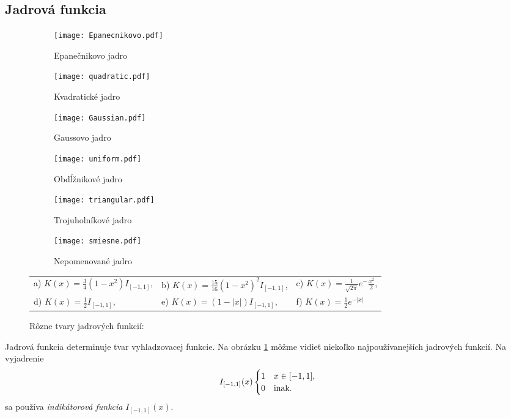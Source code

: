 \subsection{Jadrová funkcia}
\begin{figure}[!ht]
\centering
\begin{subfigure}{.3\textwidth}
  \centering
  \texttt{[image: Epanecnikovo.pdf]}
  \caption{Epanečnikovo jadro}
\end{subfigure}%
\begin{subfigure}{.3\textwidth}
  \centering
  \texttt{[image: quadratic.pdf]}
  \caption{Kvadratické jadro}
\end{subfigure}
\begin{subfigure}{.3\textwidth}
  \centering
  \texttt{[image: Gaussian.pdf]}
  \caption{Gaussovo jadro}
\end{subfigure}
\begin{subfigure}{.3\textwidth}
  \centering
  \texttt{[image: uniform.pdf]}
  \caption{Obdĺžnikové jadro}
\end{subfigure}
\begin{subfigure}{.3\textwidth}
  \centering
  \texttt{[image: triangular.pdf]}
  \caption{Trojuholníkové jadro}
\end{subfigure}
\begin{subfigure}{.3\textwidth}
  \centering
  \texttt{[image: smiesne.pdf]}
  \caption{Nepomenované jadro}
\end{subfigure}
\centering
\caption{Rôzne tvary jadrových funkcií:}\label{kernelShapeTypes}
\begin{tabular}{ l l l }
 a) $K(x)=\frac{3}{4}(1-x^2)I_{[-1,1]}$, & b) $K(x)=\frac{15}{16}(1-x^2)^2I_{[-1,1]}$, & c) $K(x)=\frac{1}{\sqrt{2\pi}}e^-\frac{x^2}{2} $, \\
 d) $K(x)=\frac{1}{2}I_{[-1,1]} $, & e) $K(x)=(1-|x|)I_{[-1,1]}$, & f) $K(x)=\frac{1}{2}e^{-|x|}$
 \end{tabular}
 
\end{figure}

Jadrová funkcia determinuje tvar vyhladzovacej funkcie. Na obrázku \ref{kernelShapeTypes} môžme vidieť niekoľko najpoužívanejších jadrových funkcií. Na vyjadrenie 
\begin{equation}
I_{[-1,1]}(x) \begin{cases}
1 & x \in [-1,1], \\ 
0 & $inak.$
\end{cases}
\end{equation}
sa používa \textit{indikátorová funkcia} $I_{[-1,1]}(x)$.

